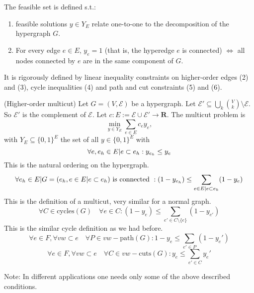 The feasible set is defined s.t.: \begin{enumerate}
    \item feasible solutions $y \in Y_E$ relate one-to-one to the decomposition of the hypergraph $G$.
    \item For every edge $e \in E$, $y_e=1$ (that is, the hyperedge $e$ is connected) $\iff$ all nodes connected by $e$ are in the same component of $G$.   
\end{enumerate}
It is rigorously defined by linear inequality constraints on higher-order edges (2) and (3), cycle inequalities (4) and path and cut constraints (5) and (6). 

\begin{definition}{(Higher-order multicut)}
Let $G=(V,\mathcal{E})$ be a hypergraph. Let $\mathcal{E}' \subseteq \bigcup_k \binom{V}{k} \setminus \mathcal{E}.$ So $\mathcal{E}'$ is the complement of $\mathcal{E}$. 
Let $c: E:=\mathcal{E} \cup \mathcal{E}' \to \mathbf{R}$. 
The multicut problem is \begin{equation}
    \min_{y \in Y_E} \sum_{e \in E} c_e y_e, 
    \end{equation} with $Y_E \subseteq \{0,1\}^E$ the set of all $y \in \{0,1\}^E$ with 
\begin{equation}
    \forall e, e_h \in E| e \subset e_h: y_{e_h} \leq y_e \\
\end{equation}
This is the natural ordering on the hypergraph. 
\begin{equation}
    \forall e_h \in E| G = (e_h, e \in E|e \subset e_h) \text{ is connected }: \break 
    (1-y_{e_h}) \leq \sum_{e \in E| e \subset e_h} (1-y_e) 
\end{equation}
This is the definition of a multicut, very similar for a normal graph. 
\begin{equation}
   \forall C \in \text{cycles}(G) \quad \forall e \in C: (1-y_e) \leq \sum_{e' \in C \setminus \{e \}} (1-y_{e'}) 
\end{equation}
This is the similar cycle definition as we had before. 
\begin{equation}
    \forall e \in F, \forall vw \subset e \quad \forall P \in vw-\text{path}(G):
    1-y_e \leq \sum_{e' \in P} (1-{y_e}') 
\end{equation}
\begin{equation}
    \forall e \in F, \forall vw \subset e  \quad \forall C \in vw-\text{cuts}(G):
    y_e \leq \sum_{e' \in C} {y_e}' 
\end{equation}
\end{definition}
Note: In different applications one needs only some of the above described conditions. 

